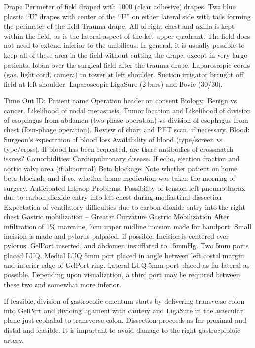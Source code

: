 \documentclass[
]{book}
\begin{document}
Drape
Perimeter of field draped with 1000 (clear adhesive) drapes. Two blue plastic ``U'' drapes with center of the ``U'' on either lateral side with tails forming the perimeter of the field Trauma drape. All of right chest and axilla is kept within the field, as is the lateral aspect of the left upper quadrant. The field does not need to extend inferior to the umbilicus. In general, it is usually possible to keep all of these area in the field without cutting the drape, except in very large patients. Ioban over the surgical field after the trauma drape. Laparoscopic cords (gas, light cord, camera) to tower at left shoulder. Suction irrigator brought off field at left shoulder. Laparoscopic LigaSure (2 bars) and Bovie (30/30).

Time Out
ID:
Patient name
Operation header on consent
Biology:
Benign vs cancer.
Likelihood of nodal metastasis.
Tumor location and
Likelihood of division of esophagus from abdomen (two-phase operation) vs division of esophagus from chest (four-phage operation).
Review of chart and PET scan, if necessary.
Blood:
Surgeon's expectation of blood loss
Availability of blood (type/screen vs type/cross).
If blood has been requested, are there antibodies of crossmatch issues?
Comorbidities:
Cardiopulmonary disease. If echo, ejection fraction and aortic valve area (if abnormal)
Beta blockage: Note whether patient on home beta blockade and if so, whether home medication was taken the morning of surgery.
Anticipated Intraop Problems:
Possibility of tension left pneumothorax due to carbon dioxide entry into left chest during mediastinal dissection
Expectation of ventilatory difficulties due to carbon dioxide entry into the right chest Gastric mobilization -- Greater Curvature
Gastric Mobilization
After infiltration of 1\% marcaine, 7cm upper midline incision made for handport. Small incision is made and pylorus palpated, if possible. Incision is centered over pylorus. GelPort inserted, and abdomen insufflated to 15mmHg. Two 5mm ports placed LUQ. Medial LUQ 5mm port placed in angle between left costal margin and interior edge of GelPort ring. Lateral LUQ 5mm port placed as far lateral as possible. Depending upon visualization, a third port may be required between these two and somewhat more inferior.

If feasible, division of gastrocolic omentum starts by delivering transverse colon into GelPort and dividing ligament with cautery and LigaSure in the avascular plane just cephalad to transverse colon. Dissection proceeds as far proximal and distal and feasible. It is important to avoid damage to the right gastroepiploic artery.
\end{document}
